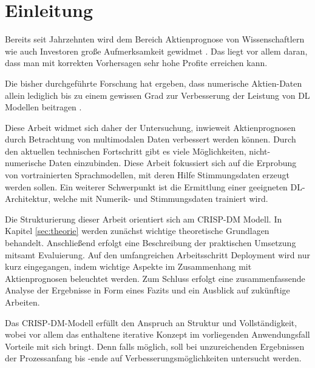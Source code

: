 \section{Einleitung}\label{sec:einleitung}

Bereits seit Jahrzehnten wird dem Bereich Aktienprognose von Wissenschaftlern wie auch Investoren große Aufmerksamkeit gewidmet \autocite[Kap. Introduction]{zhang2022transformer}. Das liegt vor allem daran, dass man mit korrekten Vorhersagen sehr hohe Profite erreichen kann.

Die bisher durchgeführte Forschung hat ergeben, dass numerische Aktien-Daten allein lediglich bis zu einem gewissen Grad zur Verbesserung der Leistung von \ac{DL} Modellen beitragen \autocite[Kap. Introduction]{zhang2022transformer}.

Diese Arbeit widmet sich daher der Untersuchung, inwieweit Aktienprognosen durch Betrachtung von multimodalen Daten verbessert werden können. Durch den aktuellen technischen Fortschritt gibt es viele Möglichkeiten, nicht-numerische Daten einzubinden. Diese Arbeit fokussiert sich auf die Erprobung von vortrainierten Sprachmodellen, mit deren Hilfe Stimmungsdaten erzeugt werden sollen. Ein weiterer Schwerpunkt ist die Ermittlung einer geeigneten \ac{DL}-Architektur, welche mit Numerik- und Stimmungsdaten trainiert wird.

Die Strukturierung dieser Arbeit orientiert sich am \ac{CRISP-DM} Modell. In Kapitel \ref{sec:theorie} werden zunächst wichtige theoretische Grundlagen behandelt. Anschließend erfolgt eine Beschreibung der praktischen Umsetzung mitsamt Evaluierung. Auf den umfangreichen Arbeitsschritt Deployment wird nur kurz eingegangen, indem wichtige Aspekte im Zusammenhang mit Aktienprognosen beleuchtet werden. Zum Schluss erfolgt eine zusammenfassende Analyse der Ergebnisse in Form eines Fazits und ein Ausblick auf zukünftige Arbeiten. 

Das \ac{CRISP-DM}-Modell erfüllt den Anspruch an Struktur und Vollständigkeit, wobei vor allem das enthaltene iterative Konzept im vorliegenden Anwendungsfall Vorteile mit sich bringt. Denn falls möglich, soll bei unzureichenden Ergebnissen der Prozessanfang bis -ende auf Verbesserungsmöglichkeiten untersucht werden.